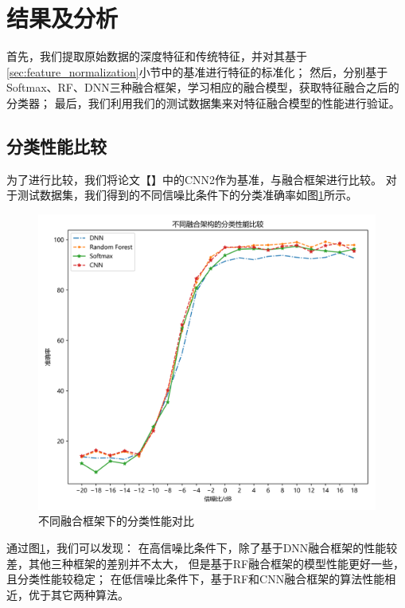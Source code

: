 \section{结果及分析}
首先，我们提取原始数据的深度特征和传统特征，并对其基于\ref{sec:feature_normalization}小节中的基准进行特征的标准化；
然后，分别基于Softmax、RF、DNN三种融合框架，学习相应的融合模型，获取特征融合之后的分类器；
最后，我们利用我们的测试数据集来对特征融合模型的性能进行验证。\par

\subsection{分类性能比较}

为了进行比较，我们将论文【】中的CNN2作为基准，与融合框架进行比较。
对于测试数据集，我们得到的不同信噪比条件下的分类准确率如图\ref{sec:fig_4_5}所示。\par

\begin{figure}[!h]
	\centering
	\includegraphics[scale=0.6]{figures/chapter_4/fig_4_5}
	\caption{不同融合框架下的分类性能对比}\label{sec:fig_4_5}
\end{figure}

通过图\ref{sec:fig_4_5}，我们可以发现：
在高信噪比条件下，除了基于DNN融合框架的性能较差，其他三种框架的差别并不太大，
但是基于RF融合框架的模型性能更好一些，且分类性能较稳定；
在低信噪比条件下，基于RF和CNN融合框架的算法性能相近，优于其它两种算法。\par

